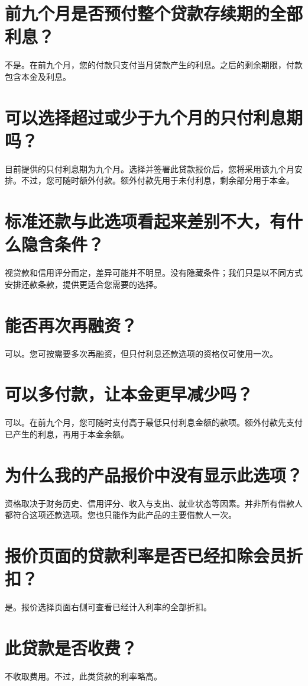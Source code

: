 \documentclass[UTF8,fontset=none,11pt,a4paper]{ctexart}
\begin{document}
\section*{前九个月是否预付整个贷款存续期的全部利息？}
不是。在前九个月，您的付款只支付当月贷款产生的利息。之后的剩余期限，付款包含本\allowbreak\mbox{金及利息。}


\section*{可以选择超过或少于九个月的只付利息期吗？}
目前提供的只付利息期为九个月。选择并签署此贷款报价后，您将采用该九个月安排。不过，您可随时额外付款。额外付款先用于未付利息，剩余部分\allowbreak\mbox{用于本金。}


\section*{标准还款与此选项看起来差别不大，有什么隐含条件？}
视贷款和信用评分而定，差异可能并不明显。没有隐藏条件；我们只是以不同方式安排还款条款，提供更适合您需\allowbreak\mbox{要的选择。}


\section*{能否再次再融资？}
可以。您可按需要多次再融资，但只付利息还款选项的资格仅可\allowbreak\mbox{使用一次。}


\section*{可以多付款，让本金更早减少吗？}
可以。在前九个月，您可随时支付高于最低只付利息金额的款项。额外付款先支付已产生的利息，再用于\allowbreak\mbox{本金余额。}


\section*{为什么我的产品报价中没有显示此选项？}
资格取决于财务历史、信用评分、收入与支出、就业状态等因素。并非所有借款人都符合这项还款选项。您也只能作为此产品的主要借\allowbreak\mbox{款人一次。}


\section*{报价页面的贷款利率是否已经扣除会员折扣？}
是。报价选择页面右侧可查看已经计入利率的\allowbreak\mbox{全部折扣。}


\section*{此贷款是否收费？}
不收取费用。不过，此类贷款的\allowbreak\mbox{利率略高。}
\end{document}
